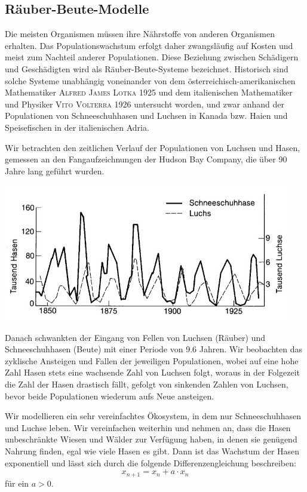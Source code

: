 \documentclass[%
11pt,%
twoside,%
titlepage,%
german,%
headsepline%
]{scrartcl}
\newcommand{\definition}[1]{\colorbox{emerald}{#1}}
\begin{document}
\clearpage

\subsection{Räuber-Beute-Modelle}

Die meisten Organismen müssen ihre Nährstoffe von anderen Organismen erhalten. Das Populationswachstum erfolgt daher zwangsläufig auf Kosten und meist zum Nachteil anderer Populationen. Diese Beziehung zwischen Schädigern und Geschädigten wird als \definition{Räuber-Beute-Systeme} bezeichnet. Historisch sind solche Systeme unabhängig voneinander von dem österreichisch-amerikanischen Mathematiker \textsc{Alfred James Lotka} 1925 und dem italienischen
Mathematiker und Physiker \textsc{Vito Volterra} 1926 untersucht worden, und zwar anhand der Populationen von Schneeschuhhasen und Luchsen in Kanada bzw. Haien und Speisefischen in der italienischen Adria.

Wir betrachten den zeitlichen Verlauf der Populationen von Luchsen
und Hasen, gemessen an den Fangaufzeichnungen der Hudson Bay Company,
die über 90 Jahre lang geführt wurden.

\begin{center}
\includegraphics[height=6cm]{pictures/haseluchs.jpg}
\end{center}

Danach schwankten der Eingang von Fellen von Luchsen (Räuber) und Schneeschuhhasen (Beute) mit einer Periode von 9.6 Jahren. Wir beobachten das zyklische Ansteigen und Fallen der
jeweiligen Populationen, wobei auf eine hohe Zahl Hasen stets eine wachsende Zahl von Luchsen folgt, woraus in der Folgezeit die Zahl der Hasen drastisch fällt, gefolgt von sinkenden Zahlen von Luchsen, bevor beide Populationen wiederum aufs Neue ansteigen.

Wir modellieren ein sehr vereinfachtes Ökosystem, in dem nur Schneeschuhhasen und Luchse leben. Wir vereinfachen weiterhin und nehmen an, dass die Hasen unbeschränkte Wiesen und Wälder zur Verfügung haben, in denen sie genügend Nahrung finden, egal wie viele Hasen es gibt. Dann ist das Wachstum der Hasen exponentiell und lässt sich durch die folgende Differenzengleichung beschreiben:
$$x_{n+1}=x_n+a\cdot x_n$$
für ein $a>0$.
\end{document}
